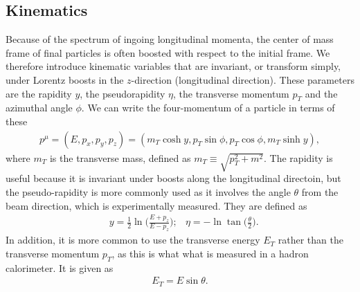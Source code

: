\documentclass[11pt]{article}
\begin{document}

\subsection*{Kinematics}
\begin{flushleft}
Because of the spectrum of ingoing longitudinal momenta, the center of mass frame of final particles is often boosted with respect to the initial frame. We therefore introduce kinematic variables that are invariant, or transform simply, under Lorentz boosts in the $z$-direction (longitudinal direction). These parameters are the rapidity $y$, the pseudorapidity $\eta$, the transverse momentum $p_T$ and the azimuthal angle $\phi$. We can write the four-momentum of a particle in terms of these
\begin{align*}
p^{\mu} = (E, p_x, p_y, p_z) = (m_T \cosh y, p_T \sin \phi, p_T \cos \phi, m_T \sinh y),
\end{align*}
where $m_T$ is the transverse mass, defined as $m_T \equiv \sqrt{p_T^2 + m^2}$. The rapidity is useful because it is invariant under boosts along the longitudinal directoin, but the pseudo-rapidity is more commonly used as it involves the angle $\theta$ from the beam direction, which is experimentally measured. They are defined as
\begin{align*}
&y = \frac{1}{2} \ln \Big( \frac{E+p_z}{E-p_z} \Big); &
\eta = - \ln \tan \big( \frac{\theta}{2} \big).
\end{align*}
In addition, it is more common to use the transverse energy $E_T$ rather than the transverse momentum $p_T$, as this is what what is measured in a hadron calorimeter. It is given as
\begin{align*}
E_T = E \sin \theta.
\end{align*}
\end{flushleft}
\end{document}

